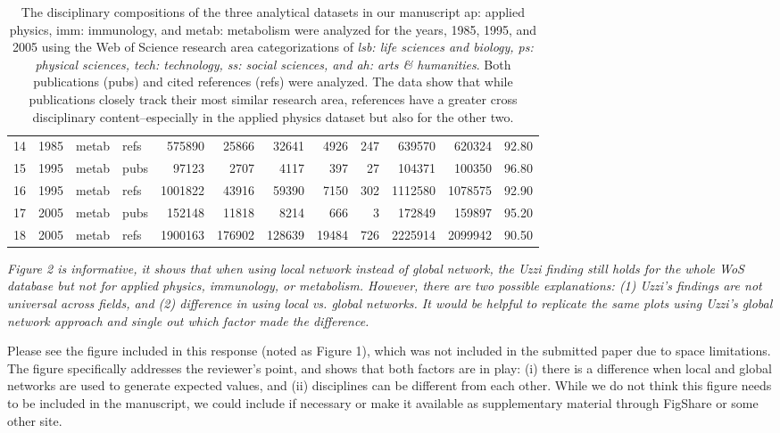\documentclass[11pt, oneside]{article}   	%
\begin{document}
\begin{table}[ht!]
{\begin{tabular}{|r rllrrrrrrr r|}
  14 & 1985 & metab & refs & 575890 & 25866 & 32641 & 4926 & 247 & 639570 & 620324 & 92.80 \\
  15 & 1995 & metab & pubs & 97123 & 2707 & 4117 & 397 &  27 & 104371 & 100350 & 96.80 \\
  16 & 1995 & metab & refs & 1001822 & 43916 & 59390 & 7150 & 302 & 1112580 & 1078575 & 92.90 \\
  17 & 2005 & metab & pubs & 152148 & 11818 & 8214 & 666 &   3 & 172849 & 159897 & 95.20 \\
  18 & 2005 & metab & refs & 1900163 & 176902 & 128639 & 19484 & 726 & 2225914 & 2099942 & 90.50 \\
   \hline
\end{tabular}
}
\caption{The disciplinary compositions of the three analytical datasets in our manuscript ap: applied physics, imm: immunology, and metab: metabolism were analyzed for the years, 1985, 1995, and 2005 using the Web of Science research area categorizations of \emph{lsb: life sciences and biology, ps: physical sciences, tech: technology, ss: social sciences, and ah: arts \& humanities}. Both publications (pubs) and cited references (refs) were analyzed. The data show that while publications closely track their most similar research area, references have a greater cross disciplinary content--especially in the applied physics dataset but also for the other two. }
\end{table}

\newpage

\emph{Figure 2 is informative, it shows that when using local network instead of global network, the Uzzi finding still holds for the whole WoS database but not for applied physics, immunology, or metabolism. However, there are two possible explanations: (1) Uzzi's findings are not universal across fields, and (2) difference in using local vs. global networks.  It would be helpful to replicate the same plots using Uzzi's global network approach and single out which factor made the difference.}

Please see the figure included in this response (noted as Figure 1), which was not included in the submitted paper due to space limitations. The figure specifically addresses the reviewer's point, and shows that both factors are in play:  (i) there is a difference when local and global networks are used to generate expected values, and  (ii)  disciplines can be different from each other. While we do not think this figure needs to be included in the manuscript, we  could include if necessary or make it available as supplementary material through FigShare or some other site. 
\end{document}
